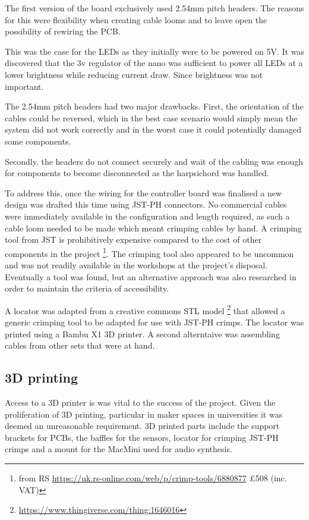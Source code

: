 The first version of the board exclusively used 2.54mm pitch headers.
The reasons for this were flexibility when creating cable looms and to
leave open the possibility of rewiring the PCB.

This was the case for the LEDs as they initially were to be powered on
5V. It was discovered that the 3v regulator of the nano was sufficient
to power all LEDs at a lower brightness while reducing current draw.
Since brightness was not important.

The 2.54mm pitch headers had two major drawbacks. First, the orientation
of the cables could be reversed, which in the best case scenario would
simply mean the system did not work correctly and in the worst case it
could potentially damaged some components.

Secondly, the headers do not connect securely and wait of the cabling
was enough for components to become disconnected as the harpsichord was
handled.

To address this, once the wiring for the controller board was finalised
a new design was drafted this time using JST-PH connectors. No
commercial cables were immediately available in the configuration and
length required, as such a cable loom needed to be made which meant
crimping cables by hand. A crimping tool from JST is prohibitively
expensive compared to the cost of other components in the project
\footnote{from RS \url{https://uk.rs-online.com/web/p/crimp-tools/6880877}
£508 (inc. VAT)}. The crimping tool also appeared to be uncommon and was
not readily available in the workshops at the project's disposal.
Eventually a tool was found, but an alternative approach was also
researched in order to maintain the criteria of accessibility.

A locator was adapted from a creative commons STL model
\footnote{\url{https://www.thingiverse.com/thing:1646016}} that allowed a
generic crimping tool to be adapted for use with JST-PH crimps. 
The locator was printed using a Bambu X1 3D printer. 
A second alterntaive was assembling cables from other sets that were at hand.

\subsection{3D printing}\label{d-printing}

Access to a 3D printer is was vital to the success of the project. Given
the proliferation of 3D printing, particular in maker spaces in
universities it was deemed an unreasonable requirement. 3D printed parts
include the support brackets for PCBs, the baffles for the sensors,
locator for crimping JST-PH crimps and a mount for the MacMini used for
audio synthesis.

